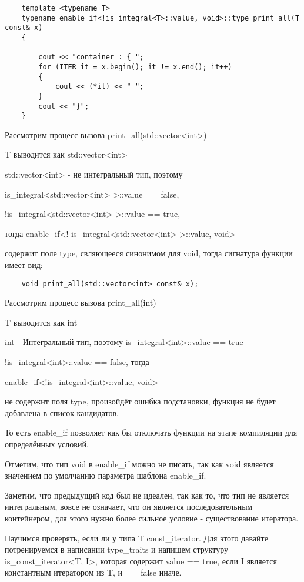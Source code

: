 	\begin{verbatim}
	template <typename T>
	typename enable_if<!is_integral<T>::value, void>::type print_all(T const& x)
	{

	    cout << "container : { ";
	    for (ITER it = x.begin(); it != x.end(); it++)
	    {
	        cout << (*it) << " ";
	    } 
	    cout << "}";
	}
	\end{verbatim}

	Рассмотрим процесс вызова print\_all(std::vector<int>)
	
	T выводится как std::vector<int>
	
	std::vector<int> - не интегральный тип, поэтому 
	
	is\_integral<std::vector<int> >::value == false, 
	
	!is\_integral<std::vector<int> >::value == true, 
	
	тогда enable\_if<!	is\_integral<std::vector<int> >::value, void> 
	
	содержит поле type, свляющееся синонимом для void, тогда сигнатура функции имеет вид:

	\begin{verbatim}
	void print_all(std::vector<int> const& x);
	\end{verbatim}

	Рассмотрим процесс вызова print\_all(int)
	
	T выводится как int
	
	int - Интегральный тип, поэтому is\_integral<int>::value == true
	
	!is\_integral<int>::value == false, тогда 
	
	enable\_if<!is\_integral<int>::value, void> 
	
	не содержит поля type, произойдёт ошибка подстановки, функция не будет добавлена в список кандидатов.
	
	\vspace{\baselineskip}
	
	То есть enable\_if позволяет как бы отключать функции на этапе компиляции для определённых условий.
	
	Отметим, что тип void в enable\_if можно не писать, так как void является значением по умолчанию параметра шаблона enable\_if.

	Заметим, что предыдущий код был не идеален, так как то, что тип не является интегральным, вовсе не означает, что он является последовательным контейнером, для этого нужно более сильное условие - существование итератора.

	Научимся проверять, если ли у типа T const\_iterator. Для этого давайте потренируемся в написании type\_traits и напишем структуру is\_const\_iterator<T, I>, которая содержит value == true, если I является константным итератором из T, и == false иначе.

